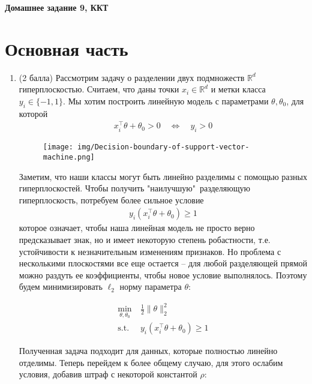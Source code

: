 \begin{center}
    \textbf{Домашнее задание 9, ККТ}
\end{center}

\section*{Основная часть}

\begin{enumerate}[label=\textbf{Задача \arabic*.}]

    \item (2 балла) Рассмотрим задачу о разделении двух подмножеств $\mathbb{R}^d$ гиперплоскостью. Считаем, что  даны точки $x_i \in \mathbb{R}^d$ и метки класса $y_i \in \{-1, 1\}$. Мы хотим построить линейную модель с параметрами $\theta, \theta_0$, для которой 
    \begin{align*}
         x_i^\top \theta + \theta_0 > 0 \quad \Longleftrightarrow \quad y_i > 0
    \end{align*}
    \begin{figure}[H]
        \centering
        \texttt{[image: img/Decision-boundary-of-support-vector-machine.png]}
    \end{figure}
    Заметим, что наши классы могут быть линейно разделимы с помощью разных гиперплоскостей. Чтобы получить "наилучшую"\   разделяющую гиперплоскость, потребуем более сильное условие
    \begin{align*}
         y_i(x_i^\top \theta + \theta_0) \geq 1
    \end{align*}
    которое означает, чтобы наша линейная модель не просто верно предсказывает знак, но и имеет некоторую степень робастности, т.е. устойчивости к незначительным изменениям признаков. Но проблема с несколькими плоскостями все еще остается -- для любой разделяющей прямой можно раздуть ее коэффициенты, чтобы новое условие выполнялось. Поэтому будем минимизировать $\ell_2$ норму параметра $\theta$:

    \begin{align*}
        \min_{\theta, \theta_0} &~ \frac{1}{2}\|\theta\|_2^2\\
        \text{s.t.} &~ y_i(x_i^\top \theta + \theta_0) \geq 1
    \end{align*}

    Полученная задача подходит для данных, которые полностью линейно отделимы. Теперь перейдем к более общему случаю, для этого ослабим условия, добавив штраф с некоторой константой $\rho$:


\end{enumerate}

